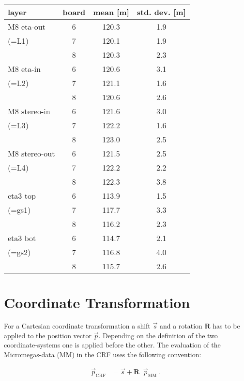 \documentclass[
twoside,            %
BCOR1.4cm,          %
10pt,               %
headings=normal,    %
headsepline,        %
clearplainpage,		%
final,              %
div=14,
open=right,
bibliography=toc
]{scrreprt}
\begin{document}
\begin{table}[!h]
	\centering		
	\begin{tabular}{lccc}
		\hline
		\hline
		layer & board & mean [\textmu m] & std. dev. [\textmu m]
		\\
		\hline
		M8 eta-out & 6 & 120.3 & 1.9
		\\
		(=L1) & 7 & 120.1 & 1.9
		\\
		 & 8 & 120.3 & 2.3
		\\
		\hline
		M8 eta-in & 6 & 120.6 & 3.1
		\\
		(=L2) & 7 & 121.1 & 1.6
		\\
		 & 8 & 120.6 & 2.6
		\\
		\hline
		M8 stereo-in & 6 & 121.6 & 3.0
		\\
		(=L3) & 7 & 122.2 & 1.6
		\\
		 & 8 & 123.0 & 2.5
		\\
		\hline
		M8 stereo-out & 6 & 121.5 & 2.5
		\\
		(=L4) & 7 & 122.2 & 2.2
		\\
		 & 8 & 122.3 & 3.8
		\\
		\hline
		eta3 top & 6 & 113.9 & 1.5
		\\
		(=gs1) & 7 & 117.7 & 3.3
		\\
		 & 8 & 116.2 & 2.3
		\\
		\hline
		eta3 bot & 6 & 114.7 & 2.1
		\\
		(=gs2) & 7 & 116.8 & 4.0
		\\
		 & 8 & 115.7 & 2.6
		\\
		\hline
		\hline
	\end{tabular}
\end{table}

\chapter{Coordinate Transformation}
\label{coordinateTransformation}

\newcommand*{\an}[1]{\alpha_{\mathrm{#1}}}
\newcommand*{\ca}[1]{\cos\!\an{#1}}
\newcommand*{\sa}[1]{\sin\!\an{#1}}

For a Cartesian coordinate transformation a shift $\vec{s}$ and a rotation $\boldsymbol{R}$ has to be applied to the position vector $\vec{p}$.
Depending on the definition of the two coordinate-systems one is applied before the other.
The evaluation of the Micromegas-data (MM) in the CRF uses the following convention:

\begin{align}
	\vec{p}_{\mathrm{CRF}} &= \vec{s} + \boldsymbol{R} \;\; \vec{p}_{\mathrm{MM}} \; .
\end{align}
\end{document}
